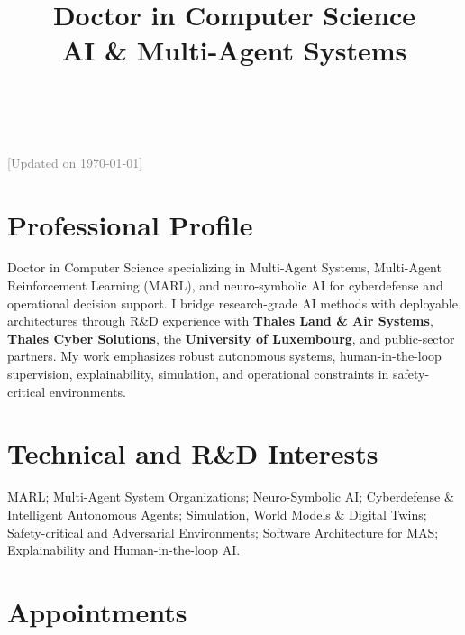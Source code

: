 \documentclass[11pt,a4paper,sans]{moderncv}
\title{Doctor in Computer Science \\ AI \& Multi-Agent Systems \\ \ \\}
\begin{document}
\makecvtitle

\vspace{-0.8cm}
\begin{center}
    {\tiny \textcolor{gray}{[Updated on \today]}}
\end{center}


\section{Professional Profile}

Doctor in Computer Science specializing in Multi-Agent Systems, Multi-Agent Reinforcement Learning (MARL), and neuro-symbolic AI for cyberdefense and operational decision support.
I bridge research-grade AI methods with deployable architectures through R\&D experience with \textbf{Thales Land \& Air Systems}, \textbf{Thales Cyber Solutions}, the \textbf{University of Luxembourg}, and public-sector partners.
My work emphasizes robust autonomous systems, human-in-the-loop supervision, explainability, simulation, and operational constraints in safety-critical environments.

\section{Technical and R\&D Interests}

MARL; Multi-Agent System Organizations; Neuro-Symbolic AI; Cyberdefense \& Intelligent Autonomous Agents; Simulation, World Models \& Digital Twins; Safety-critical and Adversarial Environments; Software Architecture for MAS; Explainability and Human-in-the-loop AI.



\section{Appointments}

\end{document}

